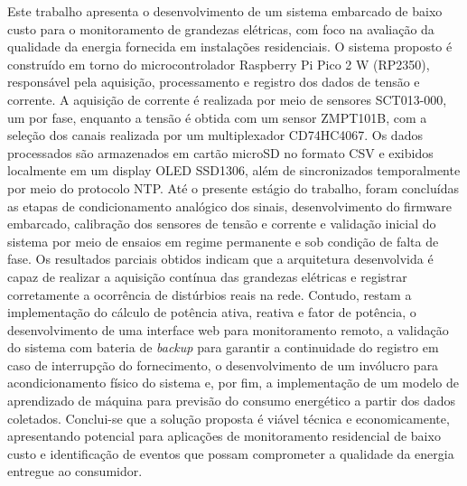 Este trabalho apresenta o desenvolvimento de um sistema embarcado de baixo
custo para o monitoramento de grandezas elétricas, com foco na avaliação
da qualidade da energia fornecida em instalações residenciais. O sistema
proposto é construído em torno do microcontrolador Raspberry Pi Pico 2 W
(RP2350), responsável pela aquisição, processamento e registro dos dados
de tensão e corrente. A aquisição de corrente é realizada por meio de
sensores SCT013-000, um por fase, enquanto a tensão é obtida com um
sensor ZMPT101B, com a seleção dos canais realizada por um multiplexador
CD74HC4067. Os dados processados são armazenados em cartão microSD no
formato CSV e exibidos localmente em um display OLED SSD1306, além de
sincronizados temporalmente por meio do protocolo NTP. Até o presente
estágio do trabalho, foram concluídas as etapas de condicionamento
analógico dos sinais, desenvolvimento do firmware embarcado, calibração
dos sensores de tensão e corrente e validação inicial do sistema por
meio de ensaios em regime permanente e sob condição de falta de fase. Os
resultados parciais obtidos indicam que a arquitetura desenvolvida é
capaz de realizar a aquisição contínua das grandezas elétricas e
registrar corretamente a ocorrência de distúrbios reais na rede.
Contudo, restam a implementação do cálculo de potência ativa, reativa e
fator de potência, o desenvolvimento de uma interface web para
monitoramento remoto, a validação do sistema com bateria de \textit{backup}
para garantir a continuidade do registro em caso de interrupção do
fornecimento, o desenvolvimento de um invólucro para acondicionamento
físico do sistema e, por fim, a implementação de um modelo de
aprendizado de máquina para previsão do consumo energético a partir dos
dados coletados. Conclui-se que a solução proposta é viável técnica e
economicamente, apresentando potencial para aplicações de monitoramento
residencial de baixo custo e identificação de eventos que possam
comprometer a qualidade da energia entregue ao consumidor.



